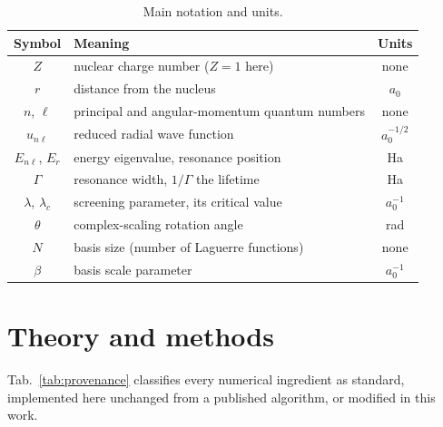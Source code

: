 \documentclass[12pt,twoside]{paper}
\begin{document}
\begin{table}[h]
\caption{Main notation and units.}
\label{tab:notation}
\centering
\footnotesize
\renewcommand{\arraystretch}{0.95}
\setlength{\tabcolsep}{6pt}
\begin{tabular}{clc}
\hline
Symbol & Meaning & Units \\
\hline
$Z$ & nuclear charge number ($Z=1$ here) & none \\
$r$ & distance from the nucleus & $a_0$ \\
$n$, $\ell$ & principal and angular-momentum quantum numbers & none \\
$u_{n\ell}$ & reduced radial wave function & $a_0^{-1/2}$ \\
$E_{n\ell}$, $E_r$ & energy eigenvalue, resonance position & Ha \\
$\Gamma$ & resonance width, $1/\Gamma$ the lifetime & Ha \\
$\lambda$, $\lambda_c$ & screening parameter, its critical value & $a_0^{-1}$ \\
$\theta$ & complex-scaling rotation angle & rad \\
$N$ & basis size (number of Laguerre functions) & none \\
$\beta$ & basis scale parameter & $a_0^{-1}$ \\
\hline
\end{tabular}
\end{table}

\section{Theory and methods}
\label{sec:theory}

Tab.~\ref{tab:provenance} classifies every numerical ingredient as
standard, implemented here unchanged from a published algorithm, or
modified in this work.
\end{document}
